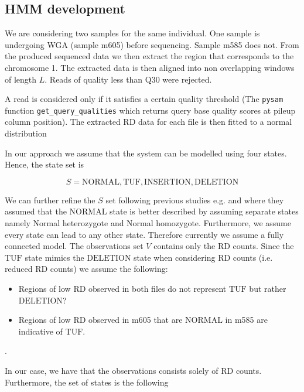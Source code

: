 \subsection{HMM development}
\label{hmm_dev}

We are considering two samples for the same individual. One sample is undergoing WGA (sample m605) before sequencing. Sample m585 does not. From the produced sequenced data we then extract the region that corresponds to the chromosome 1. The extracted data is then aligned into non overlapping windows 
of length $L$. Reads of quality less than Q30 were rejected. 



A read is considered only if it satisfies a certain
quality threshold (The \texttt{pysam} function \texttt{get_query_qualities} which returns query base quality scores at pileup column position). The extracted RD data for each file is then fitted to a normal distribution
  
In our approach we assume that the system can be modelled using four states. Hence, the state set is

\begin{equation}
S = {\text{NORMAL}, \text{TUF}, \text{INSERTION}, \text{DELETION}}
\end{equation}

We can further refine the $S$ set following previous studies e.g.
\cite{coella2007} and \cite{Wang2007} where they assumed that the
$\text{NORMAL}$ state is better described by assuming separate states namely Normal heterozygote and Normal homozygote. 
Furthermore, we assume every state can lead to any other state.
Therefore currently we assume a fully connected model.
The observations set $V$ contains only the RD counts. Since the $\text{TUF}$ state mimics the $\text{DELETION}$ state when considering RD counts (i.e. reduced RD counts) we assume the following:

\begin{itemize}
	\item Regions of low RD observed in both files do not represent $\text{TUF}$ but rather $\text{DELETION}$?
	\item Regions of low RD observed in m605 that are $\text{NORMAL}$ in m585 are indicative of $\text{TUF}$.
\end{itemize}  

.


In our case, we have that the observations consists solely of RD counts. Furthermore, the set of states is the following




